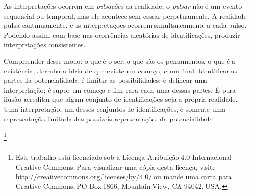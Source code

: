 \documentclass[11pt]{article}
\begin{document}
	As interpretações ocorrem em \textit{pulsações} da realidade, o \textit{pulsar} não é um evento sequencial ou temporal, mas ele acontece sem cessar perpetuamente. A realidade pulsa continuamente, e as interpretações ocorrem simultaneamente a cada pulso. Podendo assim, com base nas ocorrências aleatórias de identificações, produzir interpretações consistentes.
	
	Compreender desse modo: o que é o ser, o que são os pensamentos, o que é a existência, derruba a ideia de que existe um começo, e um final. Identificar as partes da potencialidade: é limitar as possibilidades; é delinear uma interpretação; é supor um começo e fim para cada uma dessas partes. É pura ilusão acreditar que algum conjunto de identificações seja a própria realidade. Uma interpretação, um desses conjuntos de identificações, é somente uma representação limitada das possíveis representações da potencialidade.
	
	\footnote{Este trabalho está licenciado sob a Licença Atribuição 4.0 Internacional Creative Commons. Para visualizar uma cópia desta licença, visite http://creativecommons.org/licenses/by/4.0/ ou mande uma carta para Creative Commons, PO Box 1866, Mountain View, CA 94042, USA.}
\end{document}
